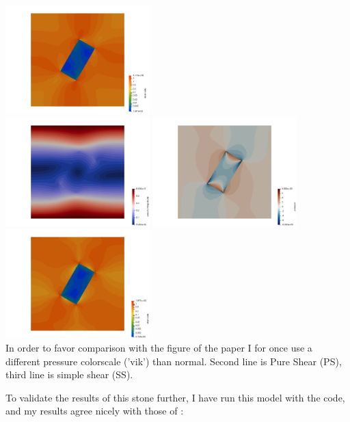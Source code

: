 \begin{center}
\includegraphics[width=5.57cm]{python_codes/fieldstone_142/results/case1/sr1}\\
\includegraphics[width=5.57cm]{python_codes/fieldstone_142/results/case1/vel2}
\includegraphics[width=5.57cm]{python_codes/fieldstone_142/results/case1/press2}
\includegraphics[width=5.57cm]{python_codes/fieldstone_142/results/case1/sr2}\\
{\captionfont In order to favor comparison with the figure of the paper I for once
use a different pressure colorscale ('vik') than normal. 
Second line is Pure Shear (PS), third line is simple shear (SS).}
\end{center}

To validate the results of this stone further, I have run this model with the \aspect
code, and my results agree nicely with those of \aspect:

